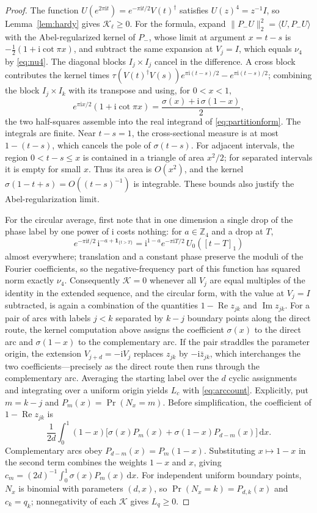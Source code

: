 \documentclass[aps,prl,reprint,superscriptaddress,longbibliography,floatfix,raggedbottom]{revtex4-2}
\newcommand{\Z}{\mathbb Z}
\newcommand{\ii}{\mathrm i}
\newcommand{\dd}{\,\mathrm d}
\newcommand{\ind}{\mathbf 1}
\newcommand{\norm}[1]{\lVert #1\rVert}
\DeclareMathOperator{\Prob}{Pr}
\newcommand{\tr}{\tau}
\begin{document}
\begin{proof}
The function $U(e^{2\pi\ii t})=e^{-\pi\ii t/2}V(t)^\dagger$ satisfies
$U(z)^4=z^{-1}I$, so Lemma~\ref{lem:hardy} gives
$\mathcal K_\ell\ge0$. For the formula, expand
$\norm{P_-U}_2^2=\langle U,P_-U\rangle$ with the Abel-regularized
kernel of $P_-$, whose limit at argument $x=t-s$ is
$-\tfrac12(1+\ii\cot\pi x)$, and subtract the same expansion at
$V_j=I$, which equals $\nu_4$ by \eqref{eq:nu4}. The diagonal blocks
$I_j\times I_j$ cancel in the difference. A cross block contributes the
kernel times $\tr(V(t)^\dagger V(s))e^{\pi\ii(t-s)/2}-e^{\pi\ii(t-s)/2}$;
combining the block $I_j\times I_k$ with its transpose and using, for
$0<x<1$,
\[
e^{\pi\ii x/2}(1+\ii\cot\pi x)=\frac{\sigma(x)+\ii\,\sigma(1-x)}2,
\]
the two half-squares assemble into the real integrand of
\eqref{eq:partitionform}. The integrals are finite. Near $t-s=1$, the cross-sectional
measure is at most $1-(t-s)$, which cancels the pole of $\sigma(t-s)$.
For adjacent intervals, the region $0<t-s\le x$ is contained in a
triangle of area $x^2/2$; for separated intervals it is empty for small
$x$. Thus its area is $O(x^2)$, and the kernel
$\sigma(1-t+s)=O((t-s)^{-1})$ is integrable. These bounds also justify
the Abel-regularization limit.

For the circular average, first note that in one dimension a single
drop of the phase label by one power of $\ii$ costs nothing: for
$a\in\Z_4$ and a drop at $T$,
\begin{equation}\label{eq:rotatedbranch}
e^{-\pi\ii t/2}\,\ii^{-a+\ind_{\{t>T\}}}
=\ii^{1-a}e^{-\pi\ii T/2}\,U_0([t-T]_1)
\end{equation}
almost everywhere; translation and a constant phase preserve the
moduli of the Fourier coefficients, so the negative-frequency part of
this function has squared norm exactly $\nu_4$.
Consequently $\mathcal K=0$ whenever all $V_j$ are equal multiples of
the identity in the extended sequence, and the circular form, with the value at $V_j=I$
subtracted, is again a combination of the quantities
$1-\operatorname{Re}z_{jk}$ and $\operatorname{Im}z_{jk}$. For a pair
of arcs with labels $j<k$ separated by $k-j$ boundary points along the
direct route, the kernel computation above assigns the coefficient
$\sigma(x)$ to the direct arc and $\sigma(1-x)$ to the complementary
arc. If the
pair straddles the parameter origin, the extension $V_{j+d}=-\ii V_j$
replaces $z_{jk}$ by $-\ii\bar z_{jk}$, which interchanges the two
coefficients---precisely as the direct route then runs through the
complementary arc. Averaging the starting label over the $d$ cyclic
assignments and integrating over a uniform origin yields $L_c$ with
\eqref{eq:arccount}.
Explicitly, put $m=k-j$ and $P_m(x)=\Prob(N_x=m)$. Before simplification,
the coefficient of $1-\operatorname{Re}z_{jk}$ is
\[
\frac1{2d}\int_0^1(1-x)
\bigl[\sigma(x)P_m(x)+\sigma(1-x)P_{d-m}(x)\bigr]\dd x.
\]
Complementary arcs obey $P_{d-m}(x)=P_m(1-x)$. Substituting $x\mapsto1-x$
in the second term combines the weights $1-x$ and $x$, giving
$c_m=(2d)^{-1}\int_0^1\sigma(x)P_m(x)\dd x$.
 For independent uniform boundary points, $N_x$ is
binomial with parameters $(d,x)$, so $\Prob(N_x=k)=P_{d,k}(x)$ and
$c_k=q_k$; nonnegativity of each $\mathcal K$ gives $L_q\ge0$.
\end{proof}
\end{document}
